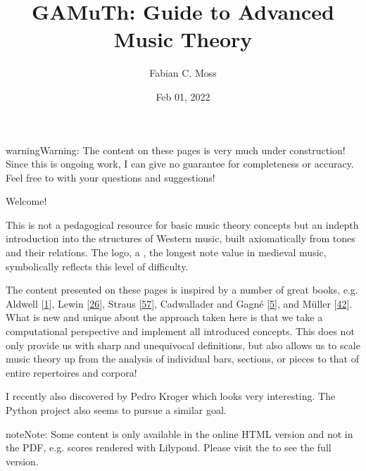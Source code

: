 \documentclass[letterpaper,10pt,english]{sphinxmanual}
\title{GAMuTh: Guide to Advanced Music Theory}
\date{Feb 01, 2022}
\author{Fabian C.\@{} Moss}
\begin{document}
\pagestyle{empty}
\sphinxmaketitle
\pagestyle{plain}
\sphinxtableofcontents
\pagestyle{normal}
\label{\detokenize{index::doc}}


\begin{sphinxadmonition}{warning}{Warning:}
\sphinxAtStartPar
The content on these pages is very much under construction!
Since this is ongoing work, I can give no guarantee for completeness or accuracy.
Feel free to  with your questions and suggestions!
\end{sphinxadmonition}

\sphinxAtStartPar
Welcome!

\sphinxAtStartPar
This is not a pedagogical resource for basic music theory concepts
but an in\sphinxhyphen{}depth introduction into the structures of Western music,
built axiomatically from tones and their relations.
The logo, a , the longest note value in medieval music,
symbolically reflects this level of difficulty.

\sphinxAtStartPar
The content presented on these pages is inspired by a number of great books, e.g.
Aldwell  {[}\hyperlink{cite.8_bibliography:id12}{1}{]}, Lewin {[}\hyperlink{cite.8_bibliography:id2}{26}{]}, Straus {[}\hyperlink{cite.8_bibliography:id3}{57}{]},
Cadwallader and Gagné {[}\hyperlink{cite.8_bibliography:id18}{5}{]}, and Müller {[}\hyperlink{cite.8_bibliography:id24}{42}{]}.
What is new and unique about the approach taken here is that we take
a computational perspective and implement all introduced concepts.
This does not only provide us with sharp and unequivocal definitions,
but also allows us to scale music theory up from the analysis of individual
bars, sections, or pieces to that of entire repertoires and corpora!

\sphinxAtStartPar
I recently also discovered  by Pedro Kroger
which looks very interesting.
The Python project  also seems to pursue a similar goal.

\begin{sphinxadmonition}{note}{Note:}
\sphinxAtStartPar
Some content is only available in the online HTML version and not in the PDF,
e.g. scores rendered with Lilypond. Please visit the  to see the full version.
\end{sphinxadmonition}
\end{document}
